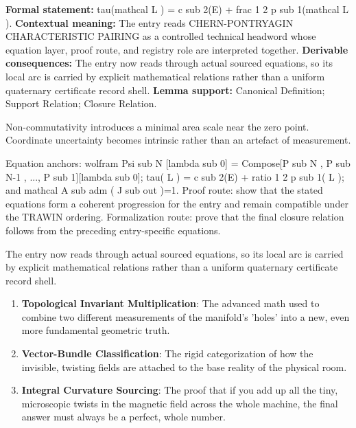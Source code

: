 \begingroup\footnotesize\setlength{\emergencystretch}{3em}\sloppy
\textbf{Formal statement:} tau(mathcal L ) = c sub 2(E) + frac 1 2 p sub 1(mathcal L ). \textbf{Contextual meaning:} The entry reads CHERN-PONTRYAGIN CHARACTERISTIC PAIRING as a controlled technical headword whose equation layer, proof route, and registry role are interpreted together. \textbf{Derivable consequences:} The entry now reads through actual sourced equations, so its local arc is carried by explicit mathematical relations rather than a uniform quaternary certificate record shell. \textbf{Lemma support:} Canonical Definition; Support Relation; Closure Relation.\par
\endgroup

Non-commutativity introduces a minimal area scale near the zero point. Coordinate uncertainty becomes intrinsic rather than an artefact of measurement.

Equation anchors: wolfram Psi sub N [lambda sub 0] = Compose[P sub N , P sub N-1 , ..., P sub 1][lambda sub 0]; tau( L ) = c sub 2(E) + ratio 1 2 p sub 1( L ); and mathcal A sub adm ( J sub out )=1. Proof route: show that the stated equations form a coherent progression for the entry and remain compatible under the TRAWIN ordering. Formalization route: prove that the final closure relation follows from the preceding entry-specific equations.

The entry now reads through actual sourced equations, so its local arc is carried by explicit mathematical relations rather than a uniform quaternary certificate record shell.
\endgroup

\begin{enumerate}[leftmargin=1.6em,itemsep=6pt,topsep=4pt]
\item \textbf{Topological Invariant Multiplication}: The advanced math used to combine two different measurements of the manifold's 'holes' into a new, even more fundamental geometric truth.
\item \textbf{Vector-Bundle Classification}: The rigid categorization of how the invisible, twisting fields are attached to the base reality of the physical room.
\item \textbf{Integral Curvature Sourcing}: The proof that if you add up all the tiny, microscopic twists in the magnetic field across the whole machine, the final answer must always be a perfect, whole number.
\end{enumerate}

